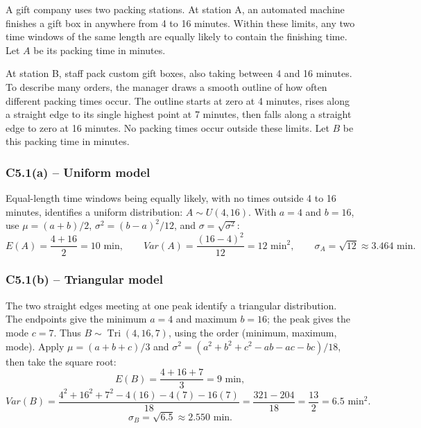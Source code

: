 {
A gift company uses two packing stations. At station A, an automated machine
finishes a gift box in anywhere from 4 to 16 minutes. Within these limits,
any two time windows of the same length are equally likely to contain the
finishing time. Let $A$ be its packing time in minutes.

At station B, staff pack custom gift boxes, also taking between 4 and 16
minutes. To describe many orders, the manager draws a smooth outline of how
often different packing times occur. The outline starts at zero at 4 minutes,
rises along a straight edge to its single highest point at 7 minutes, then
falls along a straight edge to zero at 16 minutes. No packing times occur
outside these limits. Let $B$ be this packing time in minutes.
\label{sol:c5-1a}
\subsubsection*{C5.1(a) -- Uniform model }
Equal-length time windows being equally likely, with no times outside
4 to 16 minutes, identifies a uniform distribution: $A\sim U(4,16)$.
With $a=4$ and $b=16$, use $\mu=(a+b)/2$,
$\sigma^2=(b-a)^2/12$, and $\sigma=\sqrt{\sigma^2}$:
\[
E(A)=\frac{4+16}{2}=10\text{ min},\qquad
Var(A)=\frac{(16-4)^2}{12}=12\text{ min}^2,
\qquad \sigma_A=\sqrt{12}\approx3.464\text{ min}.
\]
\label{sol:c5-1b}
\subsubsection*{C5.1(b) -- Triangular model }
The two straight edges meeting at one peak identify a triangular distribution.
The endpoints give the minimum $a=4$ and maximum $b=16$; the peak gives
the mode $c=7$. Thus $B\sim\operatorname{Tri}(4,16,7)$, using the order
(minimum, maximum, mode). Apply $\mu=(a+b+c)/3$ and
$\sigma^2=(a^2+b^2+c^2-ab-ac-bc)/18$, then take the square root:
\[
E(B)=\frac{4+16+7}{3}=9\text{ min},
\]
\[
Var(B)=\frac{4^2+16^2+7^2-4(16)-4(7)-16(7)}{18}
=\frac{321-204}{18}=\frac{13}{2}=6.5\text{ min}^2.
\]
\[
\sigma_B=\sqrt{6.5}\approx2.550\text{ min}.
\]
}

